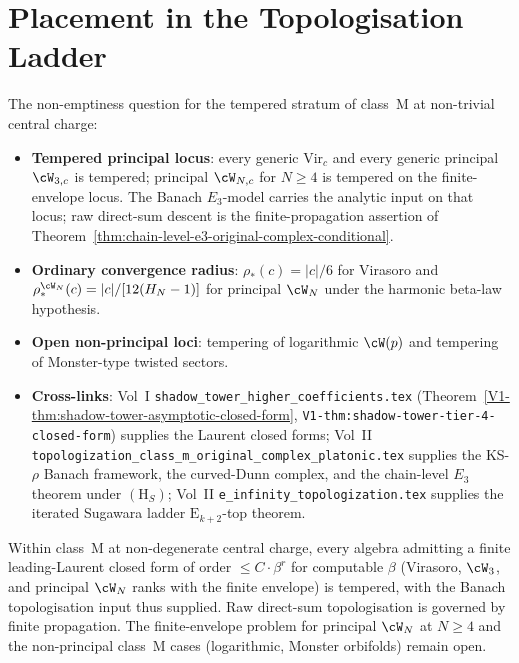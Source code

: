 \section{Placement in the Topologisation Ladder}
\label{sec:tempered-stratum-location}

The non-emptiness question for the tempered stratum of class~M at
non-trivial central charge:

\begin{itemize}[nosep]
\item \textbf{Tempered principal locus}: every generic
 $\mathrm{Vir}_c$ and every generic principal $\cW_{3,c}$ is
 tempered; principal $\cW_{N,c}$ for $N\ge4$ is tempered on the
 finite-envelope locus. The Banach $E_3$-model carries the analytic
 input on that locus; raw direct-sum descent is the finite-propagation
 assertion of
 Theorem~\ref{thm:chain-level-e3-original-complex-conditional}.
\item \textbf{Ordinary convergence radius}:
 $\rho_*(c)=|c|/6$ for Virasoro and
 $\rho_*^{\cW_N}(c)=|c|/[12(H_N-1)]$ for principal $\cW_N$ under the
 harmonic beta-law hypothesis.
\item \textbf{Open non-principal loci}: tempering of logarithmic
 $\cW(p)$ and tempering of Monster-type twisted sectors.
\item \textbf{Cross-links}: Vol~I
 \texttt{shadow\_tower\_higher\_coefficients.tex}
 (Theorem~\ref{V1-thm:shadow-tower-asymptotic-closed-form},
 \texttt{V1-thm:shadow-tower-tier-4-closed-form}) supplies the
 Laurent closed forms; Vol~II
 \texttt{topologization\_class\_m\_original\_complex\_platonic.tex}
 supplies the KS-$\rho$ Banach framework, the curved-Dunn complex,
 and the chain-level $E_3$ theorem under $(\mathrm{H}_S)$; Vol~II
 \texttt{e\_infinity\_topologization.tex} supplies the iterated
 Sugawara ladder $\mathrm{E}_{k+2}$-top theorem.
\end{itemize}

Within class~M at non-degenerate central charge, every algebra
admitting a finite leading-Laurent closed form of order
$\le C \cdot \beta^r$ for computable $\beta$ (Virasoro, $\cW_3$, and
principal $\cW_N$ ranks with the finite envelope) is tempered, with the
Banach topologisation input thus supplied. Raw direct-sum
topologisation is governed by finite propagation. The
finite-envelope problem for principal $\cW_N$ at $N\ge4$ and the
non-principal class~M cases (logarithmic, Monster orbifolds) remain
open.

